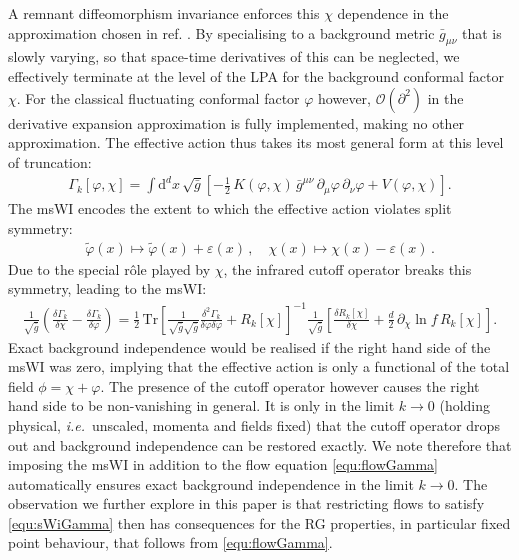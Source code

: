 \documentclass[11pt]{book} %
\newcommand\ie{\textit{i.e.}\ }
\newcommand{\eps}{\varepsilon}
\newcommand{\vp}{\varphi}
\newcommand{\dclnf}{\,\partial_\chi\! \ln\! f \,}
\numberwithin{equation}{chapter}
\begin{document}
A remnant diffeomorphism invariance enforces this $\chi$ dependence in the approximation chosen in
ref. \cite{Dietz:2015owa}.
By specialising to a background metric ${\bar g}_{\mu\nu}$ that is slowly varying,
so that space-time derivatives of this can be neglected, we effectively terminate at the level of
the LPA for the background conformal factor $\chi$.
For the classical fluctuating conformal factor $\vp$ however,
$\mathcal{O}(\partial^2)$ in the derivative expansion approximation is fully implemented,
making no other approximation.
The effective action thus takes its most general form at this level of truncation:
\begin{align}
  \Gamma_k[\varphi, \chi] = \int \mathrm d^dx \, \sqrt{\bar g}
  \left[
    - \frac{1}{2} \, K(\varphi,\chi) \, \bar g^{\mu\nu} \, \partial_{\mu}\varphi \, \partial_{\nu}\varphi
    + V(\varphi,\chi)
  \right] .
  \label{trunc}
\end{align}
The msWI encodes the extent to which the effective action violates split symmetry:
\begin{align}
  \tilde \vp(x) \mapsto \tilde \vp(x) + \eps(x) \,, \quad \chi(x) \mapsto \chi(x) -\eps(x)\,.
  \label{equ:split-symmetry}
\end{align}
Due to the special r\^ole played by $\chi$, the infrared cutoff operator breaks this symmetry,
leading to the msWI:
\begin{align}
  \frac{1}{\sqrt{\bar g}}
  \left(
    \frac{\delta\Gamma_k}{\delta \chi} - \frac{\delta \Gamma_k}{\delta \vp}
  \right)
  = \frac{1}{2} \, \mathrm{Tr}
  \left[
    \frac{1}{\sqrt{\bar g}\sqrt{\bar g}}\frac{\delta^2\Gamma_k}
    {\delta \vp \delta \vp}+ R_k[\chi]
  \right]^{-1}
  \frac{1}{\sqrt{\bar g}}
  \left[
    \frac{\delta R_k[\chi] }{\delta \chi}+\frac{d}{2}\dclnf R_k[\chi]
  \right] .
  \label{equ:sWiGamma}
\end{align}
Exact background independence would be realised if the right hand side of the msWI was zero,
implying that the effective action is only a functional of the total field $\phi = \chi + \vp$.
The presence of the cutoff operator however causes the right hand side to be non-vanishing in general.
It is only in the limit $k\rightarrow0$ (holding physical, \ie unscaled,
momenta and fields fixed) that the cutoff operator drops out and background independence can be
restored exactly. We note therefore that imposing the msWI in addition to the flow equation
\eqref{equ:flowGamma} automatically ensures exact background independence in the limit $k\rightarrow0$.
The observation we further explore in this paper is that restricting flows to
satisfy \eqref{equ:sWiGamma} then has consequences for the RG properties,
in particular fixed point behaviour, that follows from \eqref{equ:flowGamma}.
\end{document}
